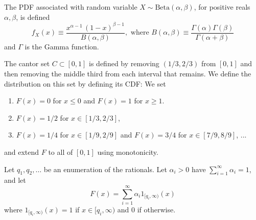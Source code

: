 \documentclass{article}
\begin{document}
      \begin{example}
        The PDF associated with random variable $X \sim \mathrm{Beta}(\alpha, \beta)$, for positive reals $\alpha, \beta$, is defined 
        \begin{equation}
          f_X (x) \equiv \frac{x^{\alpha-1} \,(1-x)^{\beta-1}}{B(\alpha, \beta)}, \text{ where } B(\alpha, \beta) \equiv \frac{\Gamma(\alpha) \Gamma(\beta)}{\Gamma(\alpha + \beta)}
        \end{equation}
        and $\Gamma$ is the Gamma function. 
      \end{example}

      \begin{example}
        The cantor set $C \subset [0, 1]$ is defined by removing $(1/3, 2/3)$ from $[0, 1]$ and then removing the middle third from each interval that remains. We define the distribution on this set by defining its CDF: We set 
        \begin{enumerate}
          \item $F(x) = 0$ for $x \leq 0$ and $F(x) = 1$ for $x \geq 1$. 
          \item $F(x) = 1/2$ for $x \in [1/3, 2/3]$, 
          \item $F(x) = 1/4$ for $x \in [1/9, 2/9]$ and $F(x) = 3/4$ for $x \in [7/9, 8/9]$, ... 
        \end{enumerate}
        and extend $F$ to all of $[0 ,1]$ using monotonicity. 
      \end{example} 

      \begin{example}
        Let $q_1, q_2, \ldots$ be an enumeration of the rationals. Let $\alpha_i > 0$ have $\sum_{i=1}^\infty \alpha_i = 1$, and let 
        \begin{equation}
          F(x) = \sum_{i=1}^\infty \alpha_i 1_{[q_i, \infty)} (x)
        \end{equation}
        where $1_{[q_i, \infty)} (x) = 1$ if $x \in [q_i, \infty)$ and $0$ if otherwise. 
      \end{example}
\end{document}
